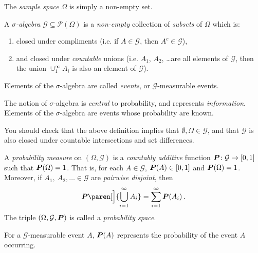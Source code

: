 \begin{definition}
  The \emph{sample space} $\Omega$ is simply a non-empty set.
\end{definition}

\begin{definition}
  A \emph{$\sigma$-algebra} $\mathcal G \subseteq \mathcal P(\Omega)$ is a \emph{non-empty} collection of \emph{subsets} of $\Omega$ which is:
  \begin{enumerate}
    \item closed under compliments (i.e. if $A \in \mathcal G$, then $A^c \in \mathcal G$),
    \item and closed under \emph{countable} unions (i.e. $A_1$, $A_2$, \dots are all elements of $\mathcal G$, then the union $\cup_1^\infty A_i$ is also an element of $\mathcal G$).
  \end{enumerate}
  Elements of the $\sigma$-algebra are called \emph{events}, or $\mathcal G$-measurable events.
\end{definition}

\begin{remark}
  The notion of $\sigma$-algebra is \emph{central} to probability, and represents \emph{information}.
  Elements of the $\sigma$-algebra are events whose probability are known.
\end{remark}

\begin{remark}
  You should check that the above definition implies that $\emptyset, \Omega \in \mathcal G$, and that $\mathcal G$ is also closed under countable intersections and set differences.
\end{remark}

\begin{definition}
  A \emph{probability measure} on $(\Omega, \mathcal G)$ is a \emph{countably additive} function $\P\colon \mathcal G \to [0, 1]$ such that $\P(\Omega) = 1$.
  That is, for each $A \in \mathcal G$, $\P(A) \in [0, 1]$ and $\P(\Omega) = 1$.
  Moreover, if $A_1,\ A_2, \dots \in \mathcal G$ are \emph{pairwise disjoint}, then
  \begin{equation*}
    \P\paren[\Big]{ \bigcup_{i = 1}^\infty A_i } = \sum_{i=1}^\infty \P(A_i)\,.
  \end{equation*}
  The triple $(\Omega, \mathcal G, \P)$ is called a \emph{probability space}.
\end{definition}

\begin{remark}
For a $\mathcal G$-measurable event $A$, $\P(A)$ represents the probability of the event $A$ occurring.
\end{remark}

